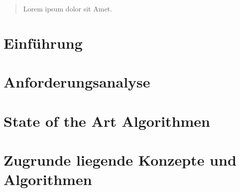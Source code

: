\documentclass[pdftex,12pt,a4paper]{report}
\begin{document}

\deckblatt


\erklaerung


\begin{abstract}

Lorem ipsum dolor sit Amet.

\end{abstract}



\tableofcontents


\chapter{Einführung}
\label{chp:introduction}



\chapter{Anforderungsanalyse}
\label{chp:anforderungsanalyse}



\chapter{State of the Art Algorithmen}
\label{chp:stateoftheart}



\chapter{Zugrunde liegende Konzepte und Algorithmen}
\label{chp:concepts}

\end{document}
